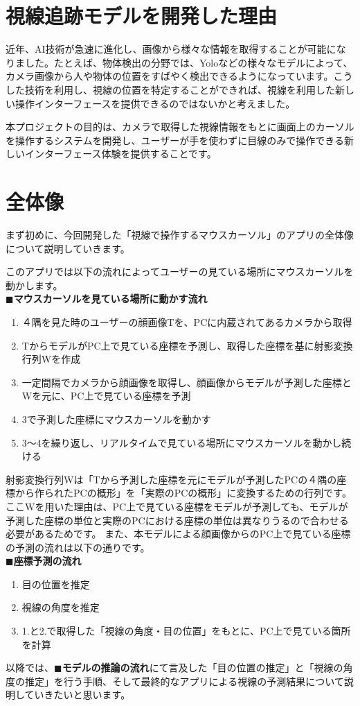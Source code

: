 \section{視線追跡モデルを開発した理由}
近年、AI技術が急速に進化し、画像から様々な情報を取得することが可能になりました。たとえば、物体検出の分野では、Yoloなどの様々なモデルによって、カメラ画像から人や物体の位置をすばやく検出できるようになっています。こうした技術を利用し、視線の位置を特定することができれば、視線を利用した新しい操作インターフェースを提供できるのではないかと考えました。

本プロジェクトの目的は、カメラで取得した視線情報をもとに画面上のカーソルを操作するシステムを開発し、ユーザーが手を使わずに目線のみで操作できる新しいインターフェース体験を提供することです。

\section{全体像}
まず初めに、今回開発した「視線で操作するマウスカーソル」のアプリの全体像について説明していきます。

このアプリでは以下の流れによってユーザーの見ている場所にマウスカーソルを動かします。\\
$\blacksquare$\textbf{マウスカーソルを見ている場所に動かす流れ}
\begin{enumerate}
    \item ４隅を見た時のユーザーの顔画像Tを、PCに内蔵されてあるカメラから取得
    \item TからモデルがPC上で見ている座標を予測し、取得した座標を基に射影変換行列Wを作成
    \item 一定間隔でカメラから顔画像を取得し、顔画像からモデルが予測した座標とWを元に、PC上で見ている座標を予測
    \item 3で予測した座標にマウスカーソルを動かす
    \item 3～4を繰り返し、リアルタイムで見ている場所にマウスカーソルを動かし続ける
\end{enumerate}
射影変換行列Wは「Tから予測した座標を元にモデルが予測したPCの４隅の座標から作られたPCの概形」を「実際のPCの概形」に変換するための行列です。
ここWを用いた理由は、PC上で見ている座標をモデルが予測しても、モデルが予測した座標の単位と実際のPCにおける座標の単位は異なりうるので合わせる必要があるためです。
また、本モデルによる顔画像からのPC上で見ている座標の予測の流れは以下の通りです。\\
\clearpage
$\blacksquare$\textbf{座標予測の流れ}
\begin{enumerate}
    \item 目の位置を推定
    \item 視線の角度を推定
    \item 1.と2.で取得した「視線の角度・目の位置」をもとに、PC上で見ている箇所を計算
\end{enumerate}
以降では、$\blacksquare$\textbf{モデルの推論の流れ}にて言及した「目の位置の推定」と「視線の角度の推定」を行う手順、そして最終的なアプリによる視線の予測結果について説明していきたいと思います。
